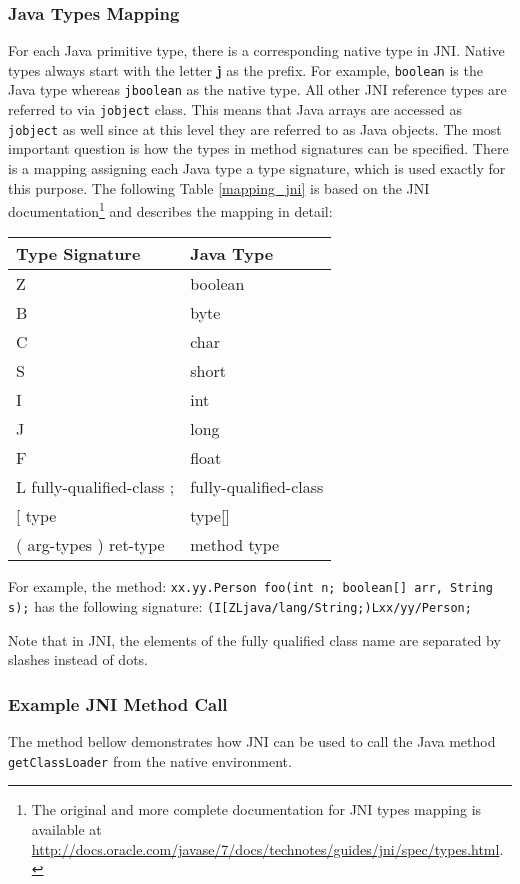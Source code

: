 \subsubsection{Java Types Mapping}
For each Java primitive type, there is a corresponding native type in JNI. Native types always start with the letter \textbf{j} as the prefix. For example, \texttt{boolean} is the Java type whereas \texttt{jboolean} as the native type. All other JNI reference types are referred to via \texttt{jobject} class. This means that Java arrays are accessed as \texttt{jobject} as well since at this level they are referred to as Java objects. The most important question is how the types in method signatures can be specified. There is a mapping assigning each Java type a type signature, which is used exactly for this purpose. The following Table \ref{mapping_jni} is based on the JNI documentation\footnote{The original and more complete documentation for JNI types mapping is available at \url{http://docs.oracle.com/javase/7/docs/technotes/guides/jni/spec/types.html}.} and describes the mapping in detail:
\begin{center}
\begin{tabular}{ l l }
	  \hline
	  Type Signature & Java Type \\ \hline
	Z & boolean \\
	B & byte \\
	C & char \\
	S & short \\
	I & int \\
	J & long \\
	F & float \\
	L fully-qualified-class ; & fully-qualified-class \\
	{[} type & type{[]}\ \\
	( arg-types ) ret-type & method type \\
\end{tabular}
\label{mapping_jni}
\end{center}

For example, the method: \newline \texttt{xx.yy.Person foo(int n; boolean[] arr, String s);} has the following signature:
\texttt{(I[ZLjava/lang/String;)Lxx/yy/Person;}

Note that in JNI, the elements of the fully qualified class name are separated by slashes instead of dots.
\subsubsection{Example JNI Method Call}
The method bellow demonstrates how JNI can be used to call the Java method \texttt{getClassLoader} from the native environment.

